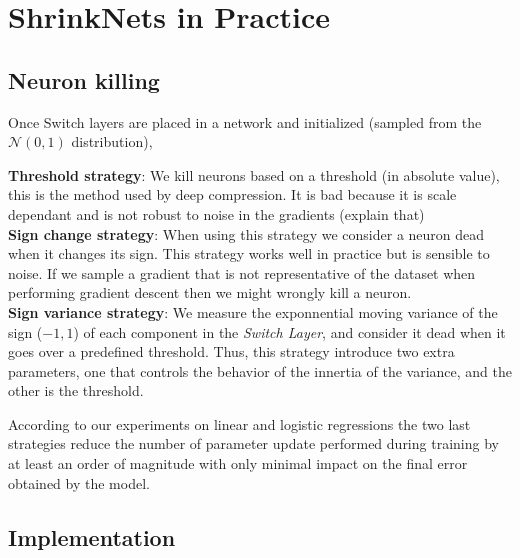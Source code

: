 \section{ShrinkNets in Practice}

\subsection{Neuron killing}
\label{neuron_killing}
Once Switch layers are placed in a network and
initialized (sampled from the $\mathcal{N}(0, 1)$ distribution),

\textbf{Threshold strategy}:  We kill neurons based on a threshold (in absolute
value), this is the method used by deep compression. It is bad because it is
scale dependant and is not robust to noise in the gradients (explain that) \\

\textbf{Sign change strategy}:  When using this strategy we consider a neuron
dead when it changes its sign. This strategy works well in practice but is
sensible to noise. If we sample a gradient that is not representative of the
dataset when performing gradient descent then we might wrongly kill a neuron. \\

\textbf{Sign variance strategy}: We measure the exponnential moving variance of
the sign ($-1, 1$) of each component in the \textit{Switch Layer}, and consider
it dead when it goes over a predefined threshold. Thus, this strategy introduce
two extra parameters, one that controls the behavior of the innertia of the
variance, and the other is the threshold.

According to our experiments on linear and logistic regressions the
two last strategies reduce the number of parameter update performed during
training by at least an order of magnitude with only minimal impact on the final
error obtained by the model.

\subsection{Implementation}

